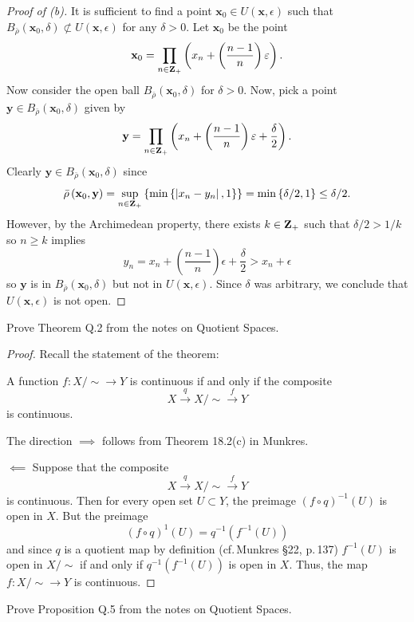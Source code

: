 \begin{proof}[Proof of (b)]
It is sufficient to find a point $\mathbf{x}_0\in
U(\mathbf{x},\epsilon)$ such that
$B_{\bar\rho}\left(\mathbf{x}_0,\delta\right)\nsubset
U(\mathbf{x},\epsilon)$ for any $\delta>0$. Let $\mathbf{x}_0$ be
the point
\[
\mathbf{x}_0=\prod_{n\in\mathbf{Z}_+}\left(x_n+\left(\frac{n-1}{n}\right)\varepsilon\right).
\]
Now consider the open ball
$B_{\bar\rho}\left(\mathbf{x}_0,\delta\right)$ for
$\delta>0$. Now, pick a point $\mathbf{y}\in
B_{\bar\rho}\left(\mathbf{x}_0,\delta\right)$ given by
\[
\mathbf{y}=\prod_{n\in\mathbf{Z}_+}
\left(x_n+\left(\frac{n-1}{n}\right)\varepsilon+\frac{\delta}{2}\right).
\]
Clearly $\mathbf{y}\in
B_{\bar\rho}\left(\mathbf{x}_0,\delta\right)$ since
\[
\bar\rho\left(\mathbf{x}_0,\mathbf{y}\right)
=\sup_{n\in\mathbf{Z}_+}\left\{\min\left\{\left|x_n-y_n\right|,1\right\}\right\}
=\min\left\{\delta/2,1\right\}
\leq\delta/2.
\]
However, by the Archimedean property, there exists $k\in\mathbf{Z}_+$
such that $\delta/2>1/k$ so $n\geq k$ implies
\[y_n=x_n+\left(\frac{n-1}{n}\right)\epsilon+\frac{\delta}{2}>x_n+\epsilon\]
so $\mathbf{y}$ is in $B_{\bar\rho}(\mathbf{x}_0,\delta)$ but not
in $U(\mathbf{x},\epsilon)$. Since $\delta$ was arbitrary, we
conclude that $U(\mathbf{x},\epsilon)$ is not open.
\end{proof}
\newpage
\begin{problem}[A]
Prove Theorem Q.2 from the notes on Quotient Spaces.
\end{problem}
\begin{proof}
Recall the statement of the theorem:
\begin{theorem*}[Theorem Q.2]
A function $f\colon X/{\sim}\to Y$ is continuous if and only if
the composite
\[
X\overset{q}{\longrightarrow}X/{\sim}\overset{f}{\longrightarrow}Y
\]
is continuous.
\end{theorem*}
The direction $\implies$ follows from Theorem 18.2(c) in Munkres.

$\impliedby$ Suppose that the composite
\[
X\overset{q}{\longrightarrow}X/{\sim}\overset{f}{\longrightarrow}Y
\]
is continuous. Then for every open set $U\subset Y$, the preimage
$(f\circ q)^{-1}(U)$ is open in $X$. But the preimage
\[
(f\circ q)^{1}(U)=q^{-1}\left(f^{-1}(U)\right)
\]
and since $q$ is a quotient map by definition (cf.\,Munkres \S22,
p.\,137) $f^{-1}(U)$ is open in $X/{\sim}$ if and only if
$q^{-1}\left(f^{-1}(U)\right)$ is open in $X$. Thus, the map
$f\colon X/{\sim}\to Y$ is continuous.
\end{proof}
\newpage
\begin{problem}[B]
Prove Proposition Q.5 from the notes on Quotient Spaces.
\end{problem}
